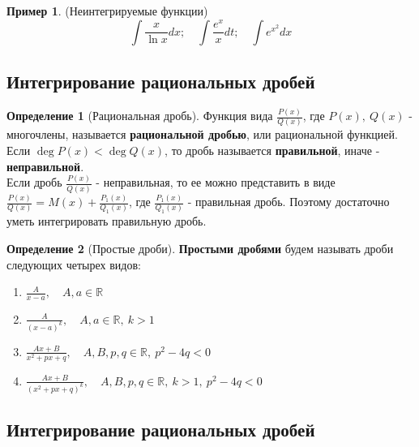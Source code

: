 \documentclass{report}
\theoremstyle{definition}
\newtheorem{definition}{Определение}[section]
\newtheorem{example}{Пример}
\begin{document}
\begin{example}
  (Неинтегрируемые функции)
  \begin{equation*}
    \int \frac{x}{\ln x} dx; \quad \int \frac{e^{x}}{x} dt; \quad \int e^{x^{2}} dx
  \end{equation*}
\end{example}

\subsection{Интегрирование рациональных дробей}

\begin{definition}[Рациональная дробь]
  Функция вида \(\frac{P(x)}{Q(x)}\), где \(P(x), \ Q(x)\) - многочлены, называется \textbf{рациональной дробью},
  или рациональной функцией. \\
  Если \(\deg P(x) < \deg Q(x)\), то дробь называется \textbf{правильной}, иначе - \textbf{неправильной}. \\
  Если дробь \(\frac{P(x)}{Q(x)}\) - неправильная, то ее можно представить в виде \(\frac{P(x)}{Q(x)} = M(x) +
  \frac{P_{1}(x)}{Q_{1}(x)}\), где \(\frac{P_{1}(x)}{Q_{1}(x)}\) - правильная дробь. Поэтому достаточно уметь
  интегрировать правильную дробь.
\end{definition}

\begin{definition}[Простые дроби]
  \textbf{Простыми дробями} будем называть дроби следующих четырех видов:
  \begin{enumerate}
    \item \(\frac{A}{x - a}, \quad A,a \in \mathbb{R}\)
    \item \(\frac{A}{(x - a)^{k}}, \quad A,a \in \mathbb{R}, \ k > 1\)
    \item \(\frac{Ax + B}{x^{2} + px + q}, \quad A,B,p,q \in \mathbb{R}, \ p^{2} - 4q < 0\)
    \item \(\frac{Ax + B}{(x^{2} + px + q)^{k}}, \quad A,B,p,q \in \mathbb{R}, \ k > 1, \ p^{2} - 4q < 0\)
  \end{enumerate}
\end{definition}

\subsection{Интегрирование рациональных дробей}
\end{document}
